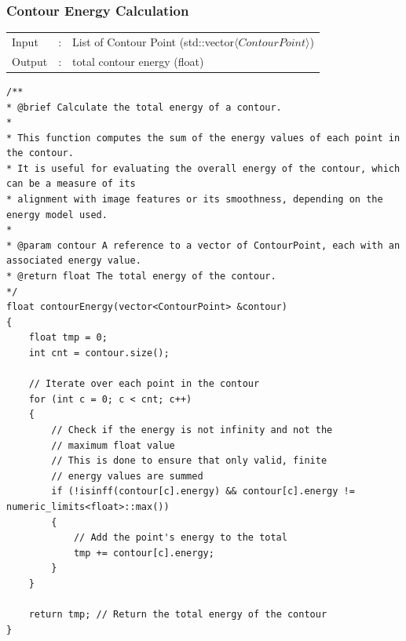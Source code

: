 \documentclass[12pt,a4paper]{report}
\begin{document}
\subsubsection{Contour Energy Calculation}
\begin{tabular}{lll}
    Input  & : & List of Contour Point (std::vector\(\langle ContourPoint\rangle\))  \\
    Output & : & total contour energy (float)   \\
\end{tabular}
\begin{lstlisting}
/**
* @brief Calculate the total energy of a contour.
*
* This function computes the sum of the energy values of each point in the contour.
* It is useful for evaluating the overall energy of the contour, which can be a measure of its
* alignment with image features or its smoothness, depending on the energy model used.
*
* @param contour A reference to a vector of ContourPoint, each with an associated energy value.
* @return float The total energy of the contour.
*/
float contourEnergy(vector<ContourPoint> &contour)
{
    float tmp = 0;
    int cnt = contour.size();

    // Iterate over each point in the contour
    for (int c = 0; c < cnt; c++)
    {
        // Check if the energy is not infinity and not the
        // maximum float value
        // This is done to ensure that only valid, finite
        // energy values are summed
        if (!isinff(contour[c].energy) && contour[c].energy != numeric_limits<float>::max())
        {
            // Add the point's energy to the total
            tmp += contour[c].energy;
        }
    }

    return tmp; // Return the total energy of the contour
}
\end{lstlisting}
\end{document}
